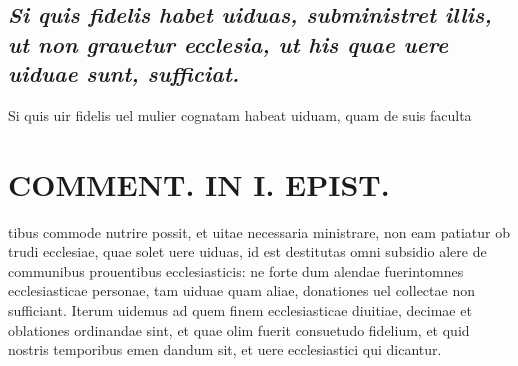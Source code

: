 \documentclass{article}
\begin{document}
\begin{pages}
\subsection*{\textit{Si quis fidelis habet uiduas, subministret illis, ut non grauetur ecclesia, ut his quae uere uiduae sunt, sufficiat. }}\pstart Si quis uir fidelis uel mulier cognatam habeat uiduam, quam de suis faculta\pend
\section*{COMMENT. IN I. EPIST. }
\marginpar{[ p.522 ]}\pstart tibus commode nutrire possit, et uitae necessaria ministrare, non eam patiatur ob trudi ecclesiae, quae solet uere uiduas, id est destitutas omni subsidio alere de communibus prouentibus ecclesiasticis: ne forte dum alendae fuerintomnes ecclesiasticae personae, tam uiduae quam aliae, donationes uel collectae non sufficiant. Iterum uidemus ad quem finem ecclesiasticae diuitiae, decimae et oblationes ordinandae sint, et quae olim fuerit consuetudo fidelium, et quid nostris temporibus emen dandum sit, et uere ecclesiastici qui dicantur.  \pend
{}
{}

\end{pages}
\end{document}

